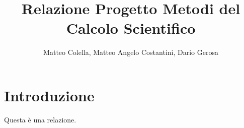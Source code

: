 \documentclass[a4paper,12pt,openany,oneside]{book}
\title{Relazione Progetto Metodi del Calcolo Scientifico}
\author{Matteo Colella, Matteo Angelo Costantini, Dario Gerosa}
\begin{document}
\selectfont
\maketitle

\chapter{Introduzione}
Questa è una relazione.
\end{document}
